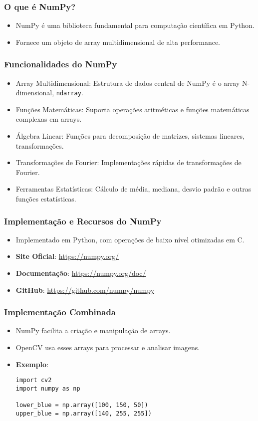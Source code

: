 \documentclass{beamer}
\begin{document}
\begin{frame}
    \frametitle{O que é NumPy?}
    \begin{itemize}
        \item NumPy é uma biblioteca fundamental para computação científica em Python.
        \item Fornece um objeto de array multidimensional de alta performance.
    \end{itemize}
\end{frame}

\begin{frame}
    \frametitle{Funcionalidades do NumPy}
    \begin{itemize}
        \item Array Multidimensional: Estrutura de dados central de NumPy é o array N-dimensional, \texttt{ndarray}.
        \item Funções Matemáticas: Suporta operações aritméticas e funções matemáticas complexas em arrays.
        \item Álgebra Linear: Funções para decomposição de matrizes, sistemas lineares, transformações.
        \item Transformações de Fourier: Implementações rápidas de transformações de Fourier.
        \item Ferramentas Estatísticas: Cálculo de média, mediana, desvio padrão e outras funções estatísticas.
    \end{itemize}
\end{frame}

\begin{frame}
    \frametitle{Implementação e Recursos do NumPy}
    \begin{itemize}
        \item Implementado em Python, com operações de baixo nível otimizadas em C.
        \item \textbf{Site Oficial}: \url{https://numpy.org/}
        \item \textbf{Documentação}: \url{https://numpy.org/doc/}
        \item \textbf{GitHub}: \url{https://github.com/numpy/numpy}
    \end{itemize}
\end{frame}

\begin{frame}
    \frametitle{Implementação Combinada}
    \begin{itemize}
        \item NumPy facilita a criação e manipulação de arrays.
        \item OpenCV usa esses arrays para processar e analisar imagens.
        \item \textbf{Exemplo}:
        \begin{verbatim}
import cv2
import numpy as np

lower_blue = np.array([100, 150, 50])
upper_blue = np.array([140, 255, 255])
        \end{verbatim}
    \end{itemize}
\end{frame}
\end{document}
